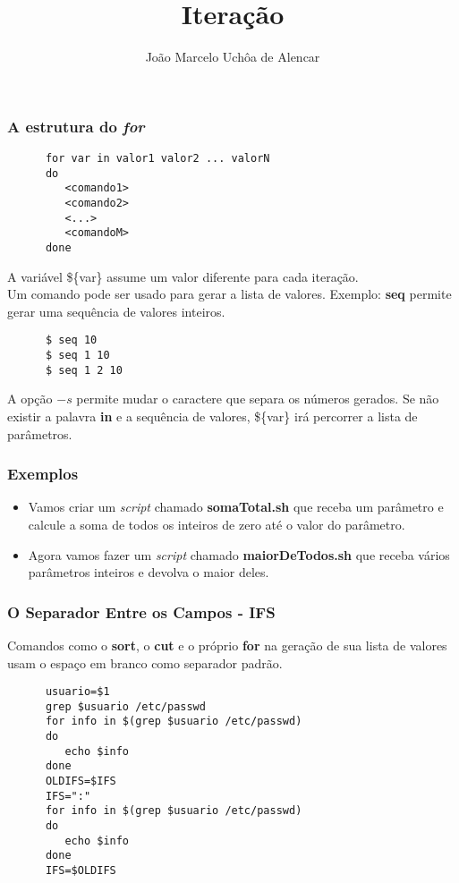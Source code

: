 \documentclass{beamer}
\title{Iteração}
\author[João Marcelo Uchôa de Alencar]{João Marcelo Uchôa de Alencar}
\institute{Universidade Federal do Ceará - Quixadá}
\begin{document}
   \begin{frame}
      \titlepage
   \end{frame}

   \begin{frame}[fragile]
      \frametitle{A estrutura do \textit{for}}
      \begin{verbatim}
      for var in valor1 valor2 ... valorN
      do
         <comando1>
         <comando2>
         <...>
         <comandoM>
      done
      \end{verbatim}
      A variável \$\{var\} assume um valor diferente para cada iteração. \\
      Um comando pode ser usado para gerar a lista de valores. Exemplo: \textbf{seq} permite gerar uma sequência de valores inteiros. \\
      \begin{verbatim}
      $ seq 10 
      $ seq 1 10 
      $ seq 1 2 10 
      \end{verbatim}
      A opção $-s$ permite mudar o caractere que separa os números gerados. Se não existir a palavra \textbf{in} e a sequência de valores, \$\{var\} irá percorrer a lista de parâmetros. \\
\end{frame}

   \begin{frame}
      \frametitle{Exemplos}
      \begin{itemize}
         \item Vamos criar um \textit{script} chamado \textbf{somaTotal.sh} que receba um parâmetro e calcule a soma de todos os inteiros de zero até o valor do parâmetro.
	 \item Agora vamos fazer um \textit{script} chamado \textbf{maiorDeTodos.sh} que receba vários parâmetros inteiros e devolva o maior deles.
      \end{itemize}
   \end{frame}

   \begin{frame}[fragile]
      \frametitle{O Separador Entre os Campos - IFS}
      Comandos como o \textbf{sort}, o \textbf{cut} e o próprio \textbf{for} na geração de sua lista de valores usam o espaço em branco como separador padrão. \\
      \begin{verbatim}
      usuario=$1
      grep $usuario /etc/passwd
      for info in $(grep $usuario /etc/passwd)
      do
         echo $info
      done
      OLDIFS=$IFS
      IFS=":"
      for info in $(grep $usuario /etc/passwd)
      do
         echo $info
      done
      IFS=$OLDIFS
      \end{verbatim}
\end{frame}
\end{document}
